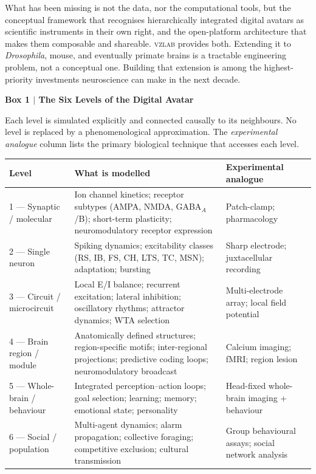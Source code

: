 \documentclass[12pt,a4paper]{article}
\begin{document}
What has been missing is not the data, nor the computational tools,
but the conceptual framework that recognises hierarchically integrated
digital avatars as scientific instruments in their own right, and the
open-platform architecture that makes them composable and shareable.
\textsc{vzlab} provides both.
Extending it to \textit{Drosophila}, mouse, and eventually primate
brains is a tractable engineering problem, not a conceptual one.
Building that extension is among the highest-priority investments
neuroscience can make in the next decade.


\clearpage
\begin{mdframed}[style=naturebox]
\textbf{Box 1 $|$ The Six Levels of the Digital Avatar}

\medskip
\noindent Each level is simulated explicitly and connected causally to its
neighbours. No level is replaced by a phenomenological approximation.
The \textit{experimental analogue} column lists the primary biological
technique that accesses each level.

\medskip
\begin{tabularx}{\linewidth}{@{} l X X @{}}
\toprule
\textbf{Level} & \textbf{What is modelled} & \textbf{Experimental analogue} \\
\midrule
1 — Synaptic / molecular &
  Ion channel kinetics; receptor subtypes (AMPA, NMDA, GABA$_A$/B);
  short-term plasticity; neuromodulatory receptor expression &
  Patch-clamp; pharmacology \\[4pt]
2 — Single neuron &
  Spiking dynamics; excitability classes (RS, IB, FS, CH, LTS, TC,
  MSN); adaptation; bursting &
  Sharp electrode; juxtacellular recording \\[4pt]
3 — Circuit / microcircuit &
  Local E/I balance; recurrent excitation; lateral inhibition;
  oscillatory rhythms; attractor dynamics; WTA selection &
  Multi-electrode array; local field potential \\[4pt]
4 — Brain region / module &
  Anatomically defined structures; region-specific motifs;
  inter-regional projections; predictive coding loops;
  neuromodulatory broadcast &
  Calcium imaging; fMRI; region lesion \\[4pt]
5 — Whole-brain / behaviour &
  Integrated perception–action loops; goal selection; learning;
  memory; emotional state; personality &
  Head-fixed whole-brain imaging + behaviour \\[4pt]
6 — Social / population &
  Multi-agent dynamics; alarm propagation; collective foraging;
  competitive exclusion; cultural transmission &
  Group behavioural assays; social network analysis \\
\bottomrule
\end{tabularx}
\end{mdframed}
\end{document}
